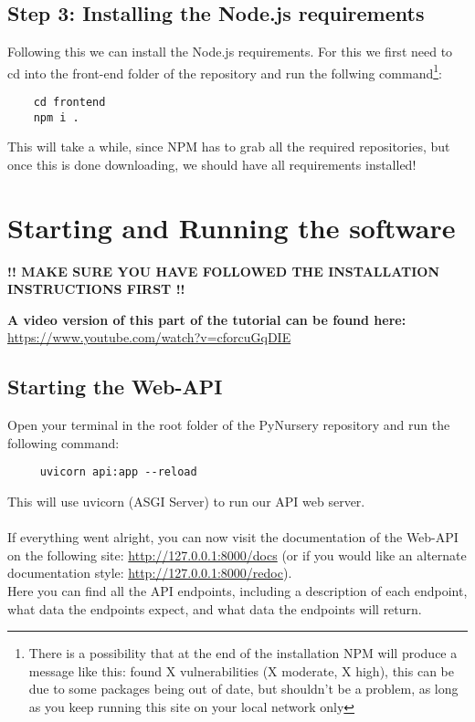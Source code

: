\documentclass{article}
\begin{document}
\subsection{Step 3: Installing the Node.js requirements}
Following this we can install the Node.js requirements. For this we first need to cd into the front-end folder of the repository and run the follwing command\footnote{There is a possibility that at the end of the installation NPM will produce a message like this: found X vulnerabilities (X moderate, X high), this can be due to some packages being out of date, but shouldn't be a problem, as long as you keep running this site on your local network only}:
\begin{verbatim}
    cd frontend
    npm i .
\end{verbatim}
This will take a while, since NPM has to grab all the required repositories, but once this is done downloading, we should have all requirements installed!

\section{Starting and Running the software}
\begin{center}
    \textbf{!! MAKE SURE YOU HAVE FOLLOWED THE INSTALLATION INSTRUCTIONS FIRST !!}
\end{center}
\textbf{A video version of this part of the tutorial can be found here:}\\
\url{https://www.youtube.com/watch?v=cforcuGqDIE}

\subsection{Starting the Web-API}
Open your terminal in the root folder of the PyNursery repository and run the following command:
\begin{verbatim}
     uvicorn api:app --reload
\end{verbatim}
This will use uvicorn (ASGI Server) to run our API web server.\\\\
If everything went alright, you can now visit the documentation of the Web-API on the following site: \url{http://127.0.0.1:8000/docs} (or if you would like an alternate documentation style: \url{http://127.0.0.1:8000/redoc}).\\
Here you can find all the API endpoints, including a description of each endpoint, what data the endpoints expect, and what data the endpoints will return.
\end{document}
